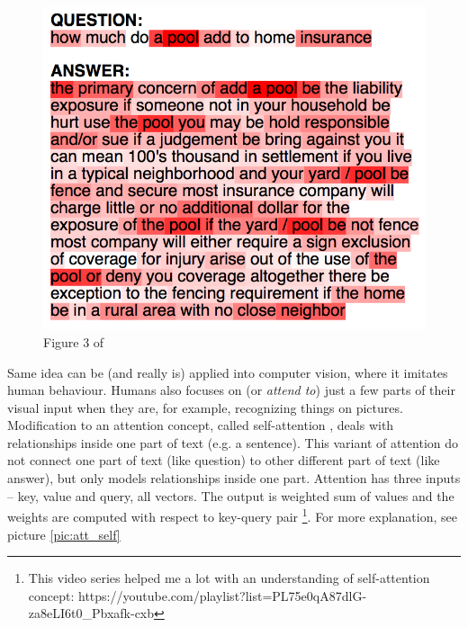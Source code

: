 \begin{figure}[h]
\label{pic:att_cnn}
\centering
\includegraphics[width=0.7\columnwidth]{../img/attention_cnn}
\caption{Figure 3 of \citep{Santos2016}
}
\end{figure}
Same idea can be (and really is) applied into computer vision, where it imitates human behaviour. Humans also focuses on (or \textit{attend to}) just  a few parts of their visual input when they are, for example, recognizing things on pictures.
Modification to an attention concept, called self-attention \citep{Cheng}, deals with relationships inside one part of text (e.g. a sentence). This variant of attention do not connect one part of text (like question) to other different part of text (like answer), but only models relationships inside one part. Attention has three inputs -- key, value and query, all vectors. The output is weighted sum of values and the weights are computed with respect to key-query pair \footnote{This video series helped me a lot with an understanding of self-attention concept: https://youtube.com/playlist?list=PL75e0qA87dlG-za8eLI6t0\_Pbxafk-cxb}. For more explanation, see picture \ref{pic:att_self}
